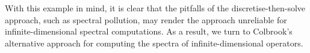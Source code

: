 
With this example in mind, it is clear that the pitfalls of the discretise-then-solve approach, such as spectral pollution, may render the approach unreliable for infinite-dimensional spectral computations. As a result, we turn to Colbrook's alternative approach for computing the spectra of infinite-dimensional operators. 









